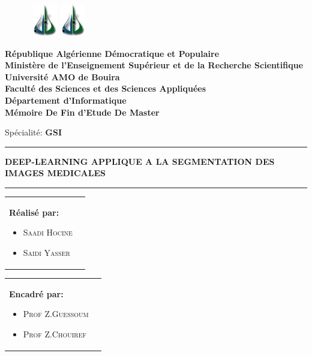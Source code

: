\begin{titlepage}

\begin{figure}[htbp]
 \hbox{
     \includegraphics[width=40px]{Sub_Files/Cover_Page/logo.png}
     \hspace*{12.5cm}
     \includegraphics[width=40px]{Sub_Files/Cover_Page/logo.png}
  }
\end{figure}

\vspace {-1.8cm}

\begin{center}
{\bf R\'{e}publique Alg\'{e}rienne D\'emocratique et Populaire\\
Minist\`{e}re de l'Enseignement Sup\'{e}rieur et de la
Recherche Scientifique} \vspace{0.2cm}\\

{\bf {\large Universit\'{e} AMO de Bouira}}\\

{\bf Facult\'{e} des Sciences et des Sciences Appliquées} \\

{ \textbf{D\'epartement d'Informatique}}\\ \vspace{0.8cm}
\Huge{\textbf{Mémoire De Fin d’Etude De
Master}}  \\\vspace{0.3cm}
\begin{center}
Spécialité: \textbf{GSI}
\end{center}

\noindent\rule{\textwidth}{1mm}
\Large{\textbf{DEEP-LEARNING APPLIQUE A LA SEGMENTATION DES IMAGES MEDICALES}}
\noindent\rule{\textwidth}{1mm}
\end{center}
\vspace{0.3cm}
\begin{tabular}{ p{9cm}  p{6cm} }
\textbf{Réalisé par:} 
\begin{itemize}
	\item \textsc{Saadi Hocine} 
	\item \textsc{Saidi Yasser} 
\end{itemize}
\end{tabular}
\begin{tabular}{ p{6cm}  p{9cm} }
\textbf{Encadré par:} 
\begin{itemize}
   \item  \textsc{Prof Z.Guessoum} 
	\item  \textsc{Prof Z.Chouiref} 
\end{itemize}


\end{tabular}
\end{titlepage}
